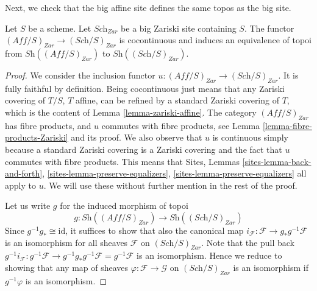 \noindent
Next, we check that the big affine site defines the same
topos as the big site.

\begin{lemma}
\label{lemma-affine-big-site-Zariski}
Let $S$ be a scheme. Let $\textit{Sch}_{Zar}$ be a big Zariski
site containing $S$.
The functor $(\textit{Aff}/S)_{Zar} \to (\textit{Sch}/S)_{Zar}$
is cocontinuous and induces an equivalence of topoi from
$\textit{Sh}((\textit{Aff}/S)_{Zar})$ to
$\textit{Sh}((\textit{Sch}/S)_{Zar})$.
\end{lemma}

\begin{proof}
We consider the inclusion functor
$u : (\textit{Aff}/S)_{Zar} \to (\textit{Sch}/S)_{Zar}$.
It is fully faithful by definition. Being cocontinuous
just means that any Zariski covering of $T/S$, $T$ affine,
can be refined by a standard Zariski covering of $T$, which
is the content of Lemma \ref{lemma-zariski-affine}.
The category $(\textit{Aff}/S)_{Zar}$ has fibre products, and $u$ commutes
with fibre products, see Lemma \ref{lemma-fibre-products-Zariski}
and its proof.
We also observe that $u$ is continuous
simply because a standard Zariski covering is a Zariski covering
and the fact that $u$ commutes with fibre products.
This means that
Sites, Lemmas \ref{sites-lemma-back-and-forth},
\ref{sites-lemma-preserve-equalizers},
\ref{sites-lemma-preserve-equalizers} all apply to $u$.
We will use these without further mention in the rest of the proof.

\medskip\noindent
Let us write $g$ for the induced morphism of topoi
$$
g : \textit{Sh}((\textit{Aff}/S)_{Zar}) \longrightarrow
\textit{Sh}((\textit{Sch}/S)_{Zar})
$$
Since $g^{-1}g_* \cong \text{id}$, it suffices to show that
also the canonical map
$i_{\mathcal{F}} : \mathcal{F} \to g_* g^{-1} \mathcal{F}$
is an isomorphism for all sheaves $\mathcal{F}$ on
$(\textit{Sch}/S)_{Zar}$. Note that the pull back
$g^{-1}i_{\mathcal{F}} : g^{-1} \mathcal{F} \to
g^{-1} g_* g^{-1} \mathcal{F} = g^{-1} \mathcal{F}$
is an isomorphism. Hence we reduce to showing that any
map of sheaves $\varphi : \mathcal{F} \to \mathcal{G}$ on
$(\textit{Sch}/S)_{Zar}$ is an isomorphism if $g^{-1}\varphi$
is an isomorphism.


\end{proof}
